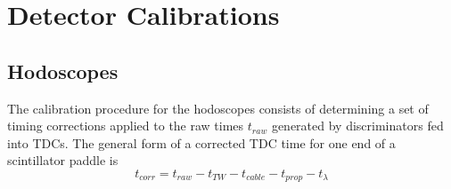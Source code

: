 \section{Detector Calibrations}
\subsection{Hodoscopes}
The calibration procedure for the hodoscopes consists of determining a set of
timing corrections applied to the raw times $t_{raw}$ generated by
discriminators fed into TDCs.
The general form of a corrected TDC time for one end of a scintillator paddle
is
\begin{equation}
    t_{corr} = t_{raw} - t_{TW} - t_{cable} - t_{prop} - t_{\lambda}
\end{equation}

